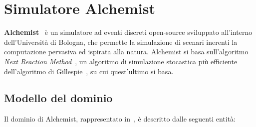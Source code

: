 \documentclass[12pt,a4paper,openright,twoside]{book}
\begin{document}
\section{Simulatore Alchemist}
\label{sec:alchemist}

\textbf{Alchemist}~\cite{DBLP:journals/jos/PianiniMV13} è un simulatore ad eventi discreti open-source sviluppato all'interno dell'Università di Bologna, che permette la simulazione di scenari inerenti la computazione pervasiva ed ispirata alla natura. 
Alchemist si basa sull'algoritmo \textit{Next Reaction Method}~\cite{doi:10.1021/jp993732q}, un algoritmo di simulazione stocastica più efficiente dell'algoritmo di Gillespie~\cite{doi:10.1021/j100540a008}, su cui quest'ultimo si basa.

\subsection{Modello del dominio}
Il dominio di Alchemist, rappresentato in~, è descritto dalle seguenti entità: 
\end{document}
